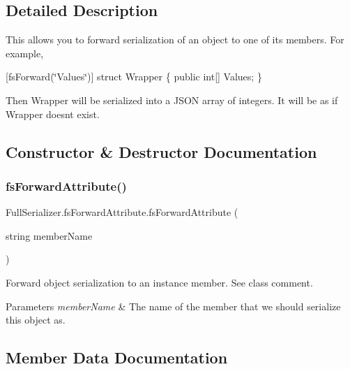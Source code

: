 \subsection{Detailed Description}
This allows you to forward serialization of an object to one of its members. For example, 

\mbox{[}fs\+Forward(\char`\"{}\+Values\char`\"{})\mbox{]} struct Wrapper \{ public int\mbox{[}\mbox{]} Values; \}

Then {\ttfamily Wrapper} will be serialized into a J\+S\+ON array of integers. It will be as if {\ttfamily Wrapper} doesn\textquotesingle{}t exist. 

\subsection{Constructor \& Destructor Documentation}
\mbox{\label{class_full_serializer_1_1fs_forward_attribute_a91c4c1907419cf137910faf2e650b194}} 
\subsubsection{\texorpdfstring{fs\+Forward\+Attribute()}{fsForwardAttribute()}}
{\footnotesize\ttfamily Full\+Serializer.\+fs\+Forward\+Attribute.\+fs\+Forward\+Attribute (\begin{DoxyParamCaption}\item[{string}]{member\+Name }\end{DoxyParamCaption})\hspace{0.3cm}{\ttfamily [inline]}}



Forward object serialization to an instance member. See class comment. 


\begin{DoxyParams}{Parameters}
{\em member\+Name} & The name of the member that we should serialize this object as.\\
\hline
\end{DoxyParams}


\subsection{Member Data Documentation}
\mbox{\label{class_full_serializer_1_1fs_forward_attribute_a25f1793738313ab75cc7539ac582cce6}} 
